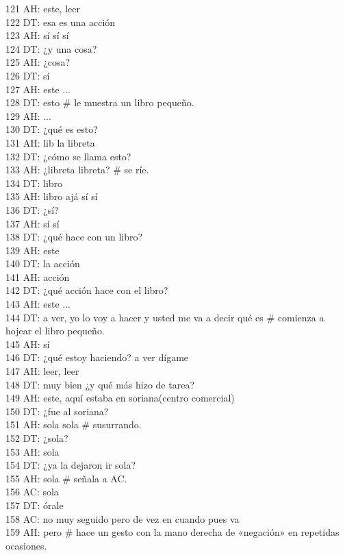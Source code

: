 121 AH: este, leer\\
122 DT: esa es una acción\\
123 AH: sí sí sí\\
124 DT: ¿y una cosa?\\
125 AH: ¿cosa?\\
126 DT: sí\\
127 AH: este ...\\
128 DT: esto \# le muestra un libro pequeño.\\
129 AH: ...\\
130 DT: ¿qué es esto?\\
131 AH: lib la libreta\\
132 DT: ¿cómo se llama esto?\\
133 AH: ¿libreta libreta? \# se ríe.\\
134 DT: libro\\
135 AH: libro ajá sí sí\\
136 DT: ¿sí?\\
137 AH: sí sí\\
138 DT: ¿qué hace con un libro?\\
139 AH: este\\
140 DT: la acción\\
141 AH: acción\\
142 DT: ¿qué acción hace con el libro?\\
143 AH: este ...\\
144 DT: a ver, yo lo voy a hacer y usted me va a decir qué es \# comienza a hojear el libro pequeño.\\
145 AH: sí\\
146 DT: ¿qué estoy haciendo? a ver dígame\\
147 AH: leer, leer\\
148 DT: muy bien ¿y qué más hizo de tarea?\\
149 AH: este, aquí estaba en soriana(centro comercial)\\
150 DT: ¿fue al soriana?\\
151 AH: sola sola \# susurrando.\\
152 DT: ¿sola?\\
153 AH: sola\\
154 DT: ¿ya la dejaron ir sola?\\
155 AH: sola \# señala a AC.\\
156 AC: sola\\
157 DT: órale\\
158 AC: no muy seguido pero de vez en cuando pues va\\
159 AH: pero \# hace un gesto con la mano derecha de «negación» en repetidas ocasiones.\\
